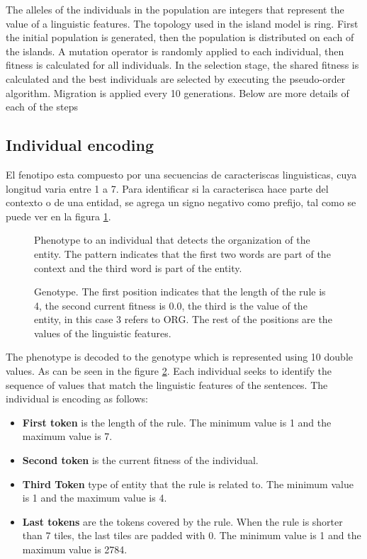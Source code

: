 \documentclass{IEEEtran}
\begin{document}
The alleles of the individuals in the population are integers that represent the value of a linguistic features. The topology used in the island model is ring. First the initial population is generated, then the population is distributed on each of the islands. A mutation operator is randomly applied to each individual, then fitness is calculated for all individuals. In the selection stage, the shared fitness is calculated and the best individuals are selected by executing the pseudo-order algorithm.
Migration is applied every 10 generations. Below are more details of each of the steps

\subsection{Individual encoding}

El fenotipo esta compuesto por una secuencias de caracteriscas linguisticas, cuya longitud varia entre 1 a 7. Para identificar si la caracterisca hace parte del contexto o de una entidad, se agrega un signo negativo como prefijo, tal como se puede ver en la figura \ref{fig:fenotype}.

\begin{figure}[ht]
  \centering
  
  \caption{Phenotype to an individual that detects the organization of the entity. The pattern indicates that the first two words are part of the context and the third word is part of the entity.}

  \label{fig:fenotype}
\end{figure}


\begin{figure}[ht]
  \centering
  
  \caption{Genotype. The first position indicates that the length of the rule is 4, the second current fitness is 0.0, the third is the value of the entity, in this case 3 refers to ORG. The rest of the positions are the values of the linguistic features.}

  \label{fig:genotype}
\end{figure}

The phenotype is decoded to the genotype which is represented using 10 double values. As can be seen in the figure \ref{fig:genotype}. Each individual seeks to identify the sequence of values that match the linguistic features of the sentences. The individual is encoding as follows:

\begin{itemize}
  \item \textbf{First token} is the length of the rule. The minimum value is 1 and the maximum value is 7.
  \item \textbf{Second token} is the current fitness of the individual.
  \item \textbf{Third Token} type of entity that the rule is related to. The minimum value is 1 and the maximum value is 4.
  \item \textbf{Last tokens} are the tokens covered by the rule. When the rule is shorter than 7 tiles, the last tiles are padded with 0. The minimum value is 1 and the maximum value is 2784.
\end{itemize}
\end{document}

